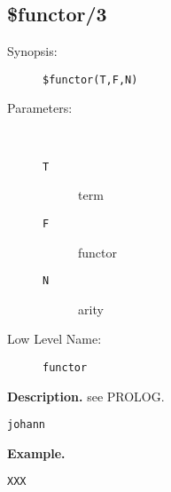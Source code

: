 %
%
%
\subsection{\$functor/3}

\begin{description}
\item[Synopsis:]
	{\tt \$functor(T,F,N)}
\item[Parameters:]\ \\[-0.5cm]
	\begin{description}
	\item[{\tt T}] term
	\item[{\tt F}] functor
	\item[{\tt N}] arity
	\end{description}
\item[Low Level Name:]
	{\tt functor}
\end{description}

\vspace*{0.5cm}
\noindent
{\bf Description.}
see PROLOG.

{\tt johann}

\vspace*{0.5cm}
\noindent
{\bf Example.}
\begin{verbatim}
XXX
\end{verbatim}


